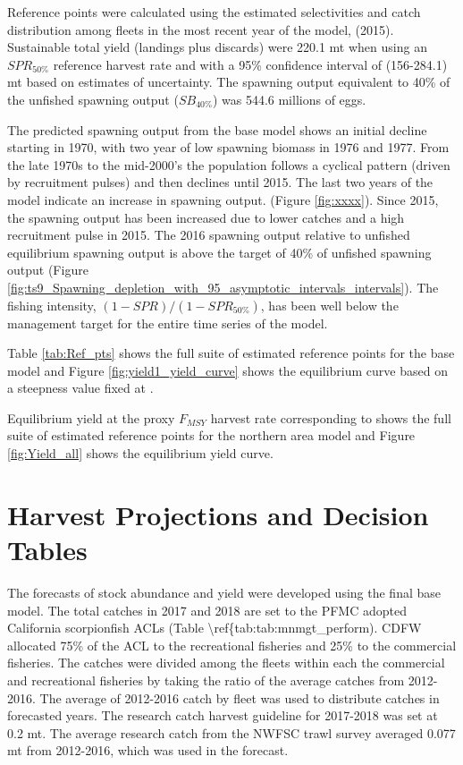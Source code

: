 \documentclass[12pt,]{article}
\begin{document}
Reference points were calculated using the estimated selectivities and
catch distribution among fleets in the most recent year of the model,
(2015). Sustainable total yield (landings plus discards) were 220.1 mt
when using an \(SPR_{50\%}\) reference harvest rate and with a 95\%
confidence interval of (156-284.1) mt based on estimates of uncertainty.
The spawning output equivalent to 40\% of the unfished spawning output
(\(SB_{40\%}\)) was 544.6 millions of eggs.

The predicted spawning output from the base model shows an initial
decline starting in 1970, with two year of low spawning biomass in 1976
and 1977. From the late 1970s to the mid-2000's the population follows a
cyclical pattern (driven by recruitment pulses) and then declines until
2015. The last two years of the model indicate an increase in spawning
output. (Figure \ref{fig:xxxx}). Since 2015, the spawning output has
been increased due to lower catches and a high recruitment pulse in
2015. The 2016 spawning output relative to unfished equilibrium spawning
output is above the target of 40\% of unfished spawning output (Figure
\ref{fig:ts9_Spawning_depletion_with_95_asymptotic_intervals_intervals}).
The fishing intensity, \((1-SPR)/(1-SPR_{50\%})\), has been well below
the management target for the entire time series of the model.

Table \ref{tab:Ref_pts} shows the full suite of estimated reference
points for the base model and Figure \ref{fig:yield1_yield_curve} shows
the equilibrium curve based on a steepness value fixed at .

Equilibrium yield at the proxy \(F_{MSY}\) harvest rate corresponding to
shows the full suite of estimated reference points for the northern area
model and Figure \ref{fig:Yield_all} shows the equilibrium yield curve.

\section{Harvest Projections and Decision
Tables}\label{harvest-projections-and-decision-tables}

The forecasts of stock abundance and yield were developed using the
final base model. The total catches in 2017 and 2018 are set to the PFMC
adopted California scorpionfish ACLs (Table
\textbackslash{}ref\{tab:tab:mnmgt\_perform). CDFW allocated 75\% of the
ACL to the recreational fisheries and 25\% to the commercial fisheries.
The catches were divided among the fleets within each the commercial and
recreational fisheries by taking the ratio of the average catches from
2012-2016. The average of 2012-2016 catch by fleet was used to
distribute catches in forecasted years. The research catch harvest
guideline for 2017-2018 was set at 0.2 mt. The average research catch
from the NWFSC trawl survey averaged 0.077 mt from 2012-2016, which was
used in the forecast.
\end{document}
